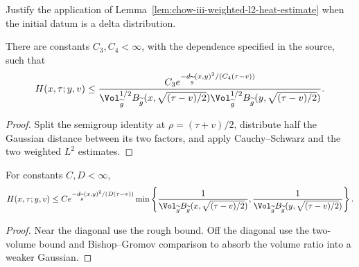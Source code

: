 \begin{claim}
\label{clm:chow-iii-weighted-l2-delta-source-exercise}
Justify the application of Lemma~\ref{lem:chow-iii-weighted-l2-heat-estimate}
when the initial datum is a delta distribution.
\end{claim}

\begin{theorem}
\label{thm:chow-iii-evolving-heat-kernel-gaussian-upper-bound}
There are constants \(C_3,C_4<\infty\), with the dependence specified in the
source, such that
\[
 H(x,\tau;y,v)\le
 \frac{C_3e^{-d_{\widetilde g}(x,y)^2/(C_4(\tau-v))}}
 {\Vol_{\widetilde g}^{1/2}B_{\widetilde g}(x,\sqrt{(\tau-v)/2})
  \Vol_{\widetilde g}^{1/2}B_{\widetilde g}(y,\sqrt{(\tau-v)/2})}.
\]
\end{theorem}
\begin{proof}
\sketch Split the semigroup identity at \(\rho=(\tau+v)/2\), distribute half the
Gaussian distance between its two factors, and apply Cauchy--Schwarz and the
two weighted \(L^2\) estimates.
\end{proof}

\begin{corollary}
\label{cor:chow-iii-evolving-heat-kernel-one-volume-upper-bound}
For constants \(C,D<\infty\),
\[
 H(x,\tau;y,v)\le Ce^{-d_{\widetilde g}(x,y)^2/(D(\tau-v))}
 \min\left\{
 \frac1{\Vol_{\widetilde g}B_{\widetilde g}(x,\sqrt{(\tau-v)/2})},
 \frac1{\Vol_{\widetilde g}B_{\widetilde g}(y,\sqrt{(\tau-v)/2})}
 \right\}.
\]
\end{corollary}
\begin{proof}
\sketch Near the diagonal use the rough bound.  Off the diagonal use the two-volume
bound and Bishop--Gromov comparison to absorb the volume ratio into a weaker
Gaussian.
\end{proof}

